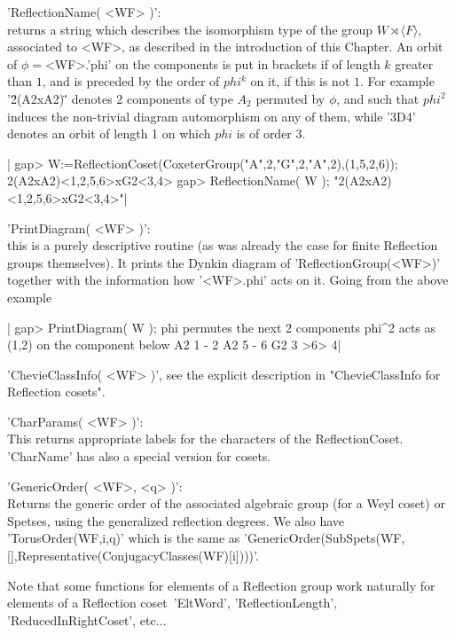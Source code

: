 'ReflectionName( <WF> )':\\ returns a string which describes the isomorphism
   type  of the  group $W\rtimes\langle  F\rangle$, associated  to <WF>, as
   described   in   the   introduction   of   this  Chapter.  An  orbit  of
   $\phi=$<WF>.'phi'  on the components is put in brackets if of length $k$
   greater than $1$, and is preceded by the order of $phi^k$ on it, if this
   is  not $1$.  For example  '\"2(A2xA2)\"' denotes  2 components  of type
   $A_2$  permuted by $\phi$, and such that $phi^2$ induces the non-trivial
   diagram  automorphism on  any of  them, while  '3D4' denotes an orbit of
   length 1 on which $phi$ is of order 3.

|    gap> W:=ReflectionCoset(CoxeterGroup("A",2,"G",2,"A",2),(1,5,2,6));
    2(A2xA2)<1,2,5,6>xG2<3,4>
    gap> ReflectionName( W );
    "2(A2xA2)<1,2,5,6>xG2<3,4>"|

'PrintDiagram( <WF> )':\\ this is  a purely  descriptive routine  (as was
     already  the case for finite  Reflection groups themselves). It prints
     the  Dynkin  diagram  of  'ReflectionGroup(<WF>)'  together  with  the
     information how '<WF>.phi' acts on it. Going from the above example\:

|    gap> PrintDiagram( W );
    phi permutes the next 2 components
    phi^2 acts as (1,2) on the component below
    A2 1 - 2
    A2 5 - 6
    G2 3 >6> 4|

'ChevieClassInfo(   <WF>   )',   see   the   explicit   description   in
"ChevieClassInfo for Reflection cosets".

'CharParams(  <WF> )':\\ This returns appropriate labels for the characters
of the ReflectionCoset. 'CharName' has also a special version for cosets.

'GenericOrder(  <WF>, <q> )':\\ Returns the generic order of the associated
     algebraic  group (for a Weyl coset)  or Spetses, using the generalized
     reflection  degrees. We  also have  'TorusOrder(WF,i,q)' which  is the
     same as
     'GenericOrder(SubSpets(WF,[],Representative(ConjugacyClasses(WF)[i])))'.

Note  that  some  functions  for   elements  of  a  Reflection  group  work
naturally   for   elements   of  a   Reflection   coset\:\
'EltWord',    'ReflectionLength', 'ReducedInRightCoset', etc$\ldots$

